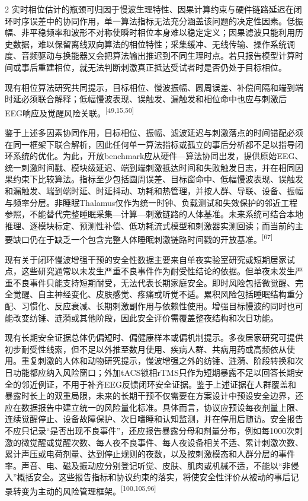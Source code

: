 \documentclass[UTF8,zihao=5,fontset=none]{ctexart}
\newcommand{\hei}{\CJKfamily{hei}}
\newcommand{\leveltwo}[1]{%
  \par\vspace{6pt}\noindent{\hei\fontsize{10pt}{16pt}\selectfont\bfseries #1\par}\vspace{2pt}}
\newcommand{\refcite}[1]{\nolinebreak[4]\textsuperscript{[#1]}}
\begin{document}
\begin{multicols}{2}
实时相位估计的瓶颈可归因于慢波生理特性、因果计算约束与硬件链路延迟在闭环时序误差中的协同作用，单一算法指标无法充分涵盖该问题的决定性因素。低振幅、非平稳频率和波形不对称使瞬时相位本身难以稳定定义；因果滤波只能利用历史数据，难以保留离线双向算法的相位特性；采集缓冲、无线传输、操作系统调度、音频驱动与换能器又会把算法输出推迟到不同生理时点。若只报告模型计算时间或事后重建相位，就无法判断刺激真正抵达受试者时是否仍处于目标相位。\par

现有相位算法研究共同提示，目标相位、慢波振幅、圆周误差、补偿间隔和端到端时延必须联合解释；低幅慢波表现、误触发、漏触发和相位命中也应与刺激后EEG响应及觉醒风险关联。\refcite{49,15,50}\par

鉴于上述多因素协同作用，目标相位、振幅、滤波延迟与刺激落点的时间错配必须在同一框架下联合解析，因此任何单一算法指标或孤立的事后分析都不足以指导闭环系统的优化。为此，开放benchmark应从硬件—算法协同出发，提供原始EEG、统一刺激时间戳、模块级延迟、端到端刺激抵达时间和失败触发日志，并在相同因果约束下比较算法。指标至少包括圆周误差、目标窗命中、低幅慢波表现、误触发和漏触发、端到端时延、时延抖动、功耗和热管理，并按人群、导联、设备、振幅与频率分层。非睡眠Thalamus仅作为统一时钟、负载测试和失效保护的邻近工程参照，不能替代完整睡眠采集—计算—刺激链路的人体基准。未来系统可结合本地推理、逐模块标定、预测性补偿、低功耗流式模型和刺激器实测回读；而当前的主要缺口仍在于缺乏一个包含完整人体睡眠刺激链路时间戳的开放基准。\refcite{67}\par

\leveltwo{6.4 长期干预的安全性与睡眠结构扰动风险}

现有关于闭环慢波增强干预的安全性数据主要来自单夜实验室研究或短期居家试点，这些研究通常以未发生严重不良事件作为耐受性结论的依据。但单夜未发生严重不良事件只能支持短期耐受，无法代表长期家庭安全。即时风险包括微觉醒、完全觉醒、自主神经变化、皮肤感觉、疼痛或听觉不适。累积风险包括睡眠结构重分配、习惯化、反应衰减、长期刺激副作用与依赖性使用。增强目标慢波的同时也可能改变纺锤、涟漪或其他阶段，因此安全评价需覆盖整夜结构和次日功能。\par

现有长期安全证据总体仍偏短时、偏健康样本或偏机制提示。多夜居家研究可提供初步耐受性线索，但不足以外推至数月使用、疾病人群、共病用药或高频依从使用。重复刺激的人体和动物研究提示，慢波增强之外的纺锤、涟漪、阶段转换和次日功能都应纳入风险窗口；外加tACS锁相rTMS只作为短期暴露不足以回答长期安全的邻近例证，不用于补齐EEG反馈闭环安全证据。鉴于上述证据在人群覆盖和暴露时长上的双重局限，未来的长期干预不仅需要在方案设计中预设安全边界，还应在数据报告中建立统一的风险量化标准。具体而言，协议应预设每夜剂量上限、连续觉醒停止、设备故障保护、次日嗜睡和认知监测，并在停用后随访。安全报告不应只记录“是否出现不良事件”，还应报告暴露分母和剂量分布，例如每1000次刺激的微觉醒或觉醒次数、每人夜不良事件、每人夜设备相关不适、累计刺激次数、累计声压或电荷剂量、达到停止规则的夜数，以及按刺激模态和人群分层的事件率。声音、电、磁及振动应分别登记听觉、皮肤、肌肉或机械不适，不能以“非侵入”概括安全。这些报告指标和协议约束的落实，将使安全性评价从被动的事后记录转变为主动的风险管理框架。\refcite{100,105,96}\par


\end{multicols}
\end{document}

